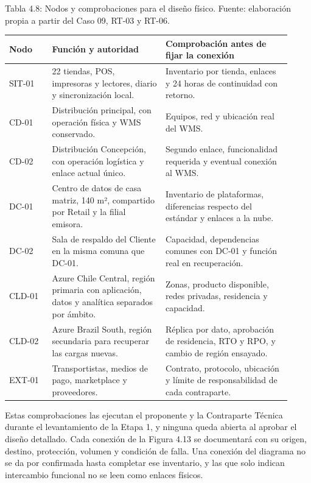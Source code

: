 \documentclass[11pt]{article}
\begin{document}
\par\vspace{0pt plus 10\baselineskip}\vspace{0pt plus -10\baselineskip}

Tabla 4.8: Nodos y comprobaciones para el diseño físico. Fuente: elaboración propia a partir del Caso 09, RT-03 y RT-06.\par\nopagebreak
\begin{longtable}{@{}p{0.14\linewidth}p{0.37\linewidth}p{0.41\linewidth}@{}}
\toprule Nodo & Función y autoridad & Comprobación antes de fijar la conexión \\
\midrule\endhead\bottomrule\endlastfoot
SIT-01 & 22 tiendas, POS, impresoras y lectores, diario y sincronización local. & Inventario por tienda, enlaces y 24 horas de continuidad con retorno. \\
CD-01 & Distribución principal, con operación física y WMS conservado. & Equipos, red y ubicación real del WMS. \\
CD-02 & Distribución Concepción, con operación logística y enlace actual único. & Segundo enlace, funcionalidad requerida y eventual conexión al WMS. \\
DC-01 & Centro de datos de casa matriz, 140 m², compartido por Retail y la filial emisora. & Inventario de plataformas, diferencias respecto del estándar y enlaces a la nube. \\
DC-02 & Sala de respaldo del Cliente en la misma comuna que DC-01. & Capacidad, dependencias comunes con DC-01 y función real en recuperación. \\
CLD-01 & Azure Chile Central, región primaria con aplicación, datos y analítica separados por ámbito. & Zonas, producto disponible, redes privadas, residencia y capacidad. \\
CLD-02 & Azure Brazil South, región secundaria para recuperar las cargas nuevas. & Réplica por dato, aprobación de residencia, RTO y RPO, y cambio de región ensayado. \\
EXT-01 & Transportistas, medios de pago, marketplace y proveedores. & Contrato, protocolo, ubicación y límite de responsabilidad de cada contraparte. \\
\end{longtable}

Estas comprobaciones las ejecutan el proponente y la Contraparte Técnica durante el levantamiento de la Etapa 1, y ninguna queda abierta al aprobar el diseño detallado. Cada conexión de la Figura 4.13 se documentará con su origen, destino, protección, volumen y condición de falla. Una conexión del diagrama no se da por confirmada hasta completar ese inventario, y las que solo indican intercambio funcional no se leen como enlaces físicos.
\end{document}
